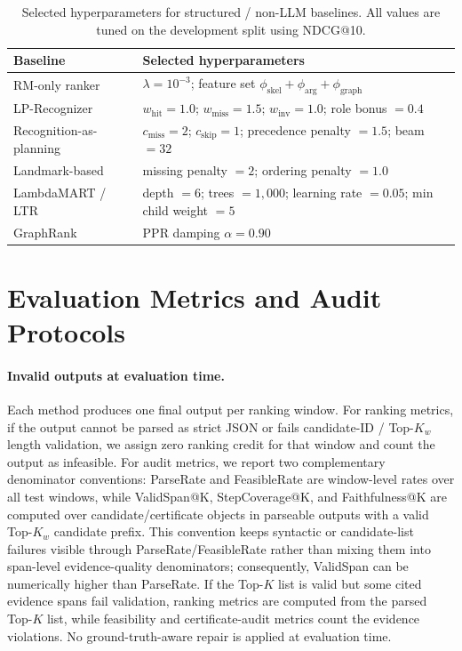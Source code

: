 \documentclass{article}
\begin{document}
\begin{table}[t]
\centering
\caption{Selected hyperparameters for structured / non-LLM baselines.
All values are tuned on the development split using NDCG@10.}
\label{tab:baseline_selected_hparams}
\small
\begin{tabularx}{\linewidth}{lY}
\hline
Baseline & Selected hyperparameters \\
\hline
RM-only ranker
& $\lambda=10^{-3}$; feature set $\phi_{\mathrm{skel}}+\phi_{\mathrm{arg}}+\phi_{\mathrm{graph}}$ \\
LP-Recognizer
& $w_{\mathrm{hit}}=1.0$; $w_{\mathrm{miss}}=1.5$; $w_{\mathrm{inv}}=1.0$; role bonus $=0.4$ \\
Recognition-as-planning
& $c_{\mathrm{miss}}=2$; $c_{\mathrm{skip}}=1$; precedence penalty $=1.5$; beam $=32$ \\
Landmark-based
& missing penalty $=2$; ordering penalty $=1.0$ \\
LambdaMART / LTR
& depth $=6$; trees $=1{,}000$; learning rate $=0.05$; min child weight $=5$ \\
GraphRank
& PPR damping $\alpha=0.90$ \\
\hline
\end{tabularx}
\end{table}

\section{Evaluation Metrics and Audit Protocols}
\label{sec:app_eval_metrics}

\paragraph{Invalid outputs at evaluation time.}
Each method produces one final output per ranking window.
For ranking metrics, if the output cannot be parsed as strict JSON or fails candidate-ID / Top-$K_w$ length validation, we assign zero ranking credit for that window and count the output as infeasible.
For audit metrics, we report two complementary denominator conventions: ParseRate and FeasibleRate are window-level rates over all test windows, while ValidSpan@K, StepCoverage@K, and Faithfulness@K are computed over candidate/certificate objects in parseable outputs with a valid Top-$K_w$ candidate prefix.
This convention keeps syntactic or candidate-list failures visible through ParseRate/FeasibleRate rather than mixing them into span-level evidence-quality denominators; consequently, ValidSpan can be numerically higher than ParseRate.
If the Top-$K$ list is valid but some cited evidence spans fail validation, ranking metrics are computed from the parsed Top-$K$ list, while feasibility and certificate-audit metrics count the evidence violations.
No ground-truth-aware repair is applied at evaluation time.
\end{document}
